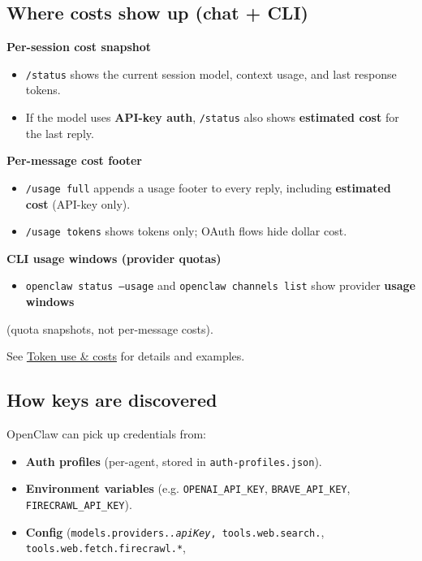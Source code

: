 \subsection{Where costs show up (chat + CLI)}


\textbf{Per-session cost snapshot}

\begin{itemize}
  \item \texttt{/status} shows the current session model, context usage, and last response tokens.
  \item If the model uses \textbf{API-key auth}, \texttt{/status} also shows \textbf{estimated cost} for the last reply.
\end{itemize}


\textbf{Per-message cost footer}

\begin{itemize}
  \item \texttt{/usage full} appends a usage footer to every reply, including \textbf{estimated cost} (API-key only).
  \item \texttt{/usage tokens} shows tokens only; OAuth flows hide dollar cost.
\end{itemize}


\textbf{CLI usage windows (provider quotas)}

\begin{itemize}
  \item \texttt{openclaw status --usage} and \texttt{openclaw channels list} show provider \textbf{usage windows}
\end{itemize}

(quota snapshots, not per-message costs).

See \href{/reference/token-use}{Token use \& costs} for details and examples.

\subsection{How keys are discovered}


OpenClaw can pick up credentials from:

\begin{itemize}
  \item \textbf{Auth profiles} (per-agent, stored in \texttt{auth-profiles.json}).
  \item \textbf{Environment variables} (e.g. \texttt{OPENAI\_API\_KEY}, \texttt{BRAVE\_API\_KEY}, \texttt{FIRECRAWL\_API\_KEY}).
  \item \textbf{Config} (\texttt{models.providers.\textit{.apiKey}, \texttt{tools.web.search.}}, \texttt{tools.web.fetch.firecrawl.*},
\end{itemize}


